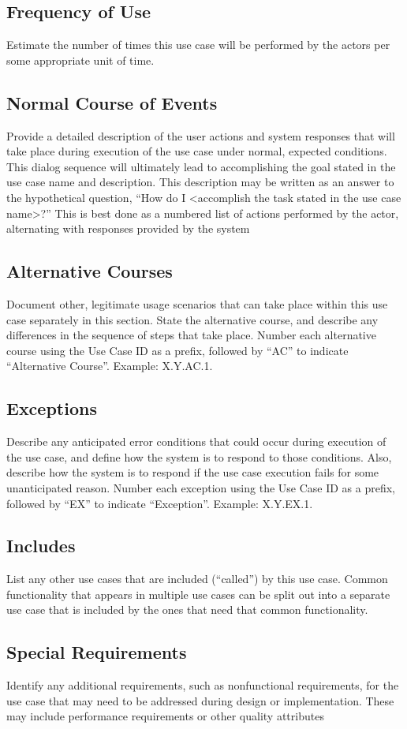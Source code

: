 \documentclass[a4paper]{article}
\begin{document}
\subsection{Frequency of Use}
Estimate the number of times this use case will be performed by the actors per some appropriate unit of time.
\subsection{Normal Course of Events}
Provide a detailed description of the user actions and system responses that will take place during execution of the use case under normal, expected conditions. This dialog sequence will ultimately lead to accomplishing the goal stated in the use case name and description. This description may be written as an answer to the hypothetical question, “How do I <accomplish the task stated in the use case name>?” This is best done as a numbered list of actions performed by the actor, alternating with responses provided by the system
\subsection{Alternative Courses}
Document other, legitimate usage scenarios that can take place within this use case separately in this section. State the alternative course, and describe any differences in the sequence of steps that take place. Number each alternative course using the Use Case ID as a prefix, followed by “AC” to indicate “Alternative Course”. Example:  X.Y.AC.1.
\subsection{Exceptions}
Describe any anticipated error conditions that could occur during execution of the use case, and define how the system is to respond to those conditions. Also, describe how the system is to respond if the use case execution fails for some unanticipated reason. Number each exception using the Use Case ID as a prefix, followed by “EX” to indicate “Exception”. Example:  X.Y.EX.1.
\subsection{Includes}
List any other use cases that are included (“called”) by this use case. Common functionality that appears in multiple use cases can be split out into a separate use case that is included by the ones that need that common functionality.
\subsection{Special Requirements}
Identify any additional requirements, such as nonfunctional requirements, for the use case that may need to be addressed during design or implementation. These may include performance requirements or other quality attributes
\end{document}
